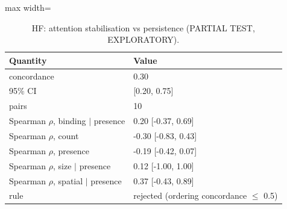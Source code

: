 \begin{table}[t]\centering\small
\caption{HF: attention stabilisation vs persistence (PARTIAL TEST, EXPLORATORY).}\label{tab:partial-hf}
\begin{adjustbox}{max width=\linewidth}
\begin{tabular}{ll}
\toprule
Quantity & Value \\
\midrule
concordance & 0.30 \\
95\% CI & [0.20, 0.75] \\
pairs & 10 \\
Spearman $\rho$, binding $\mid$ presence & 0.20 [-0.37, 0.69] \\
Spearman $\rho$, count & -0.30 [-0.83, 0.43] \\
Spearman $\rho$, presence & -0.19 [-0.42, 0.07] \\
Spearman $\rho$, size $\mid$ presence & 0.12 [-1.00, 1.00] \\
Spearman $\rho$, spatial $\mid$ presence & 0.37 [-0.43, 0.89] \\
rule & rejected (ordering concordance $\le$ 0.5) \\
\bottomrule
\end{tabular}
\end{adjustbox}
\end{table}
